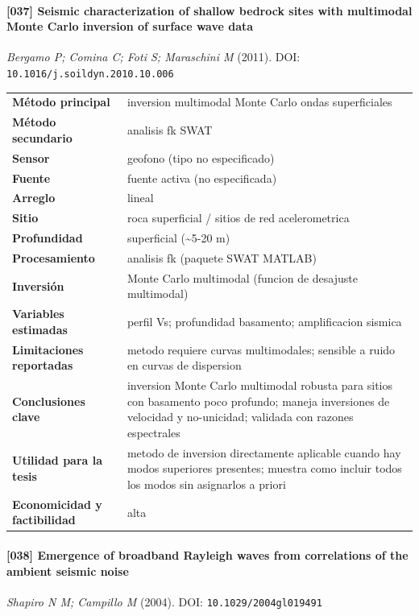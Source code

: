 \paragraph{[037] Seismic characterization of shallow bedrock sites with multimodal Monte Carlo inversion of surface wave data} \emph{Bergamo P; Comina C; Foti S; Maraschini M} (2011).
{\scriptsize DOI: \texttt{10.1016/j.soildyn.2010.10.006}}

\begin{center}\scriptsize
\begin{tabularx}{\textwidth}{@{}>{\bfseries}p{3.3cm} X@{}}
\toprule
M\'etodo principal & inversion multimodal Monte Carlo ondas superficiales \\
M\'etodo secundario & analisis fk SWAT \\
Sensor & geofono (tipo no especificado) \\
Fuente & fuente activa (no especificada) \\
Arreglo & lineal \\
Sitio & roca superficial / sitios de red acelerometrica \\
Profundidad & superficial (\textasciitilde{}5-20 m) \\
Procesamiento & analisis fk (paquete SWAT MATLAB) \\
Inversi\'on & Monte Carlo multimodal (funcion de desajuste multimodal) \\
Variables estimadas & perfil Vs; profundidad basamento; amplificacion sismica \\
Limitaciones reportadas & metodo requiere curvas multimodales; sensible a ruido en curvas de dispersion \\
Conclusiones clave & inversion Monte Carlo multimodal robusta para sitios con basamento poco profundo; maneja inversiones de velocidad y no-unicidad; validada con razones espectrales \\
Utilidad para la tesis & metodo de inversion directamente aplicable cuando hay modos superiores presentes; muestra como incluir todos los modos sin asignarlos a priori \\
Economicidad y factibilidad & alta \\
\bottomrule
\end{tabularx}
\end{center}

\paragraph{[038] Emergence of broadband Rayleigh waves from correlations of the ambient seismic noise} \emph{Shapiro N M; Campillo M} (2004).
{\scriptsize DOI: \texttt{10.1029/2004gl019491}}

